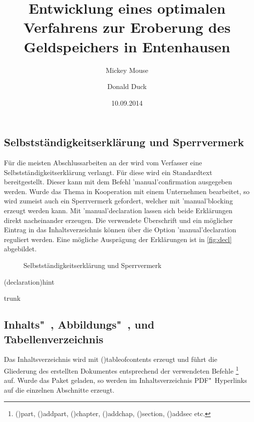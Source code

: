 \documentclass[%
  english,ngerman,%
  cdgeometry=no,DIV=12,%
  cd=false,cdfont=false,cdtitle=true,%
  headings=normal,%
  automark,%
  listof=toc,%
]{tudscrartcl}
\begin{document}
\subsection{Selbstständigkeitserklärung und Sperrvermerk}

Für die meisten Abschlussarbeiten an der \TnUD wird vom Verfasser eine 
Selbstständigkeitserklärung verlangt. Für diese wird ein Standardtext 
bereitgestellt. Dieser kann mit dem Befehl \Macro'manual'{confirmation} 
ausgegeben werden. Wurde das Thema in Kooperation mit einem Unternehmen 
bearbeitet, so wird zumeist auch ein Sperrvermerk gefordert, welcher mit 
\Macro'manual'{blocking} erzeugt werden kann. Mit \Macro'manual'{declaration} 
lassen sich beide Erklärungen direkt nacheinander erzeugen. Die verwendete 
Überschrift und ein möglicher Eintrag in das Inhaltsverzeichnis können über die 
Option \Option'manual'{declaration} reguliert werden. Eine mögliche Ausprägung 
der Erklärungen ist in \autoref{fig:decl} abgebildet.
%
\begin{figure}
\centering
{}
\caption{%
  Selbstständigkeitserklärung und Sperrvermerk%
  \label{fig:decl}%
}
\end{figure}

\begin{Code}(declaration){hint}
\title{%
  Entwicklung eines optimalen Verfahrens zur Eroberung des
  Geldspeichers in Entenhausen
}
\author{Mickey Mouse\and Donald Duck}
\date{10.09.2014}
\declaration[company=FIRMA]
\end{Code}
\begin{Code}[nolst]{trunk}
\declaration[company=FIRMA]

\end{Code}



\subsection{Inhalts"~, Abbildungs"~, und Tabellenverzeichnis}

Das Inhaltsverzeichnis wird mit \Macro(){tableofcontents} 
erzeugt und führt die Gliederung des erstellten Dokumentes entsprechend der 
verwendeten Befehle%
\footnote{%
  \Macro(){part},
  \Macro(){addpart}, 
  \Macro(){chapter}, 
  \Macro(){addchap}, 
  \Macro(){section},
  \Macro(){addsec} etc.%
}
auf. Wurde das Paket  geladen, so werden im 
Inhaltsverzeichnis PDF"~Hyperlinks auf die einzelnen Abschnitte erzeugt.
\end{document}

